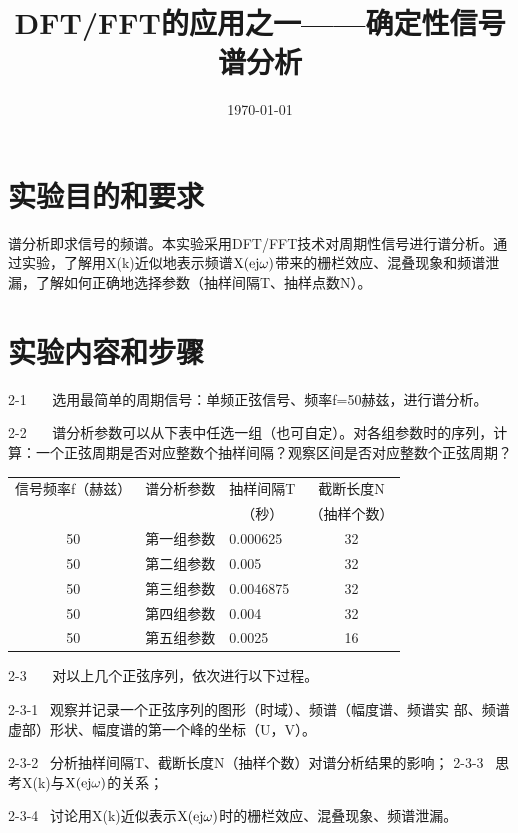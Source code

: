 \documentclass{../source/Experiment copy}
\title{DFT/FFT的应用之一——确定性信号谱分析}
\date{\today}
\begin{document}
\makeheader
\section{实验目的和要求}
谱分析即求信号的频谱。本实验采用DFT/FFT技术对周期性信号进行谱分析。通过实验，了解用X(k)近似地表示频谱$\rm  X(ej\omega)$带来的栅栏效应、混叠现象和频谱泄漏，了解如何正确地选择参数（抽样间隔T、抽样点数N）。

\section{实验内容和步骤}
2-1 \,  \,  \, 选用最简单的周期信号：单频正弦信号、频率f=50赫兹，进行谱分析。

2-2 \,  \,  \, 谱分析参数可以从下表中任选一组（也可自定）。对各组参数时的序列，计算：一个正弦周期是否对应整数个抽样间隔？观察区间是否对应整数个正弦周期？
\begin{table}[H]
    \centering
    \begin{tabular}{|c|c|l|c|}
        \hline
        {信号频率f（赫兹）} & {谱分析参数} & \multicolumn{1}{c|}{抽样间隔T} & {截断长度N}  \\
        {}                  & {}           & \multicolumn{1}{c|}{（秒）}    & （抽样个数） \\ \hline
        50                  & 第一组参数   & 0.000625                       & 32           \\ \hline
        50                  & 第二组参数   & 0.005                          & 32           \\ \hline
        50                  & 第三组参数   & 0.0046875                      & 32           \\ \hline
        50                  & 第四组参数   & 0.004                          & 32           \\ \hline
        50                  & 第五组参数   & 0.0025                         & 16           \\ \hline
    \end{tabular}
\end{table}
2-3 \,  \,  \, 对以上几个正弦序列，依次进行以下过程。

2-3-1 \, 观察并记录一个正弦序列的图形（时域）、频谱（幅度谱、频谱实 部、频谱虚部）形状、幅度谱的第一个峰的坐标（U，V）。

2-3-2 \, 分析抽样间隔T、截断长度N（抽样个数）对谱分析结果的影响；
2-3-3 \, 思考X(k)与$\rm  X(ej\omega)$的关系；

2-3-4 \, 讨论用X(k)近似表示$\rm  X(ej\omega)$时的栅栏效应、混叠现象、频谱泄漏。
\end{document}
